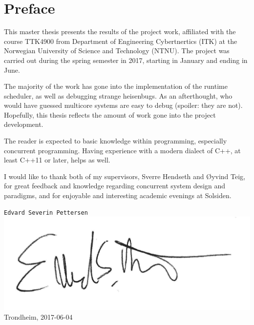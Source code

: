 
\newpage
{}
\section*{Preface}


This master thesis presents the results of the project work, affiliated with the course TTK4900
from Department of Engineering Cybertnertics (ITK) at the Norwegian University of Science
and Technology (NTNU). The project was carried out during the spring semester in 2017, starting in January and ending in June.

The majority of the work has gone into the implementation of the runtime scheduler, as well as debugging strange heisenbugs. As an afterthought, who would have guessed multicore systems are easy to debug (spoiler: they are not). Hopefully, this thesis reflects the amount of work gone into the project development.

The reader is expected to basic knowledge within programming, especially concurrent programming. Having experience with a modern dialect of C++, at least C++11 or later, helps as well. 

I would like to thank both of my supervisors, Sverre Hendseth and Øyvind Teig, for great feedback and knowledge regarding concurrent system design and paradigms, and for enjoyable and interesting academic evenings at Solsiden.


\begin{flushright}
\texttt{Edvard Severin Pettersen}\\
\includegraphics[width=0.3\linewidth,right]{fig/signature}
Trondheim, 2017-06-04
\end{flushright}

\afterpage{\blankpage}
